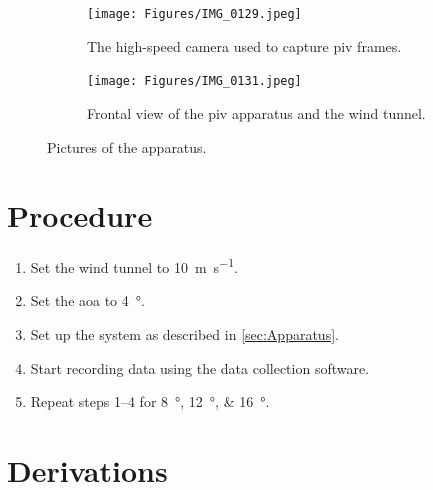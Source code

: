 \begin{figure}[htpb]
    \begin{subfigure}{0.49\textwidth}
        \centering
        \texttt{[image: Figures/IMG\_0129.jpeg]}
        \caption{The high-speed camera used to capture \acrshort{piv} frames.}
        \label{fig:high-speed_camera}
    \end{subfigure}
    \begin{subfigure}{0.49\textwidth}
        \centering
        \texttt{[image: Figures/IMG\_0131.jpeg]}
        \caption{Frontal view of the \acrshort{piv} apparatus and the wind tunnel.}
        \label{fig:full_apparatus}
    \end{subfigure}
    \caption{Pictures of the apparatus.}
    \label{fig:apparatus}
    \vspace*{3.5in}
\end{figure}

\section{Procedure} \label{sec:Prodedure}

\begin{enumerate}
    \item Set the wind tunnel to \qty{10}{\meter\per\second}.
    \item Set the \acrshort{aoa} to \qty{4}{\degree}.
    \item Set up the system as described in \autoref{sec:Apparatus}.
    \item Start recording data using the data collection software.
    \item Repeat steps \numrange{1}{4} for \qtylist{8;12;16}{\degree}.
\end{enumerate}

\newpage

\section{Derivations} \label{sec: Derivations}

